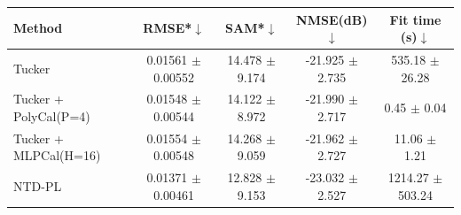 \begin{tabular}{@{}l c c c c@{}}
\toprule
Method & RMSE*$\downarrow$ & SAM*$\downarrow$ & NMSE(dB)$\downarrow$ & Fit time (s)$\downarrow$\\
\midrule
Tucker & 0.01561 $\pm$ 0.00552 & 14.478 $\pm$ 9.174 & -21.925 $\pm$ 2.735 & 535.18 $\pm$ 26.28\\
Tucker + PolyCal(P=4) & 0.01548 $\pm$ 0.00544 & 14.122 $\pm$ 8.972 & -21.990 $\pm$ 2.717 & 0.45 $\pm$ 0.04\\
Tucker + MLPCal(H=16) & 0.01554 $\pm$ 0.00548 & 14.268 $\pm$ 9.059 & -21.962 $\pm$ 2.727 & 11.06 $\pm$ 1.21\\
NTD-PL & 0.01371 $\pm$ 0.00461 & 12.828 $\pm$ 9.153 & -23.032 $\pm$ 2.527 & 1214.27 $\pm$ 503.24\\
\bottomrule
\end{tabular}
